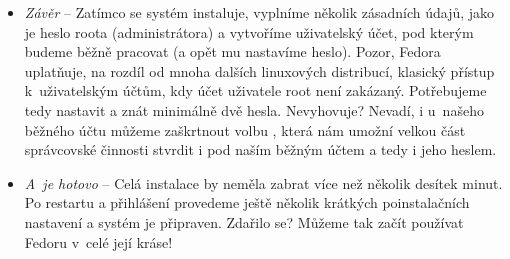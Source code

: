 \begin{itemize}
\item\emph{Závěr} -- Zatímco se systém instaluje, vyplníme několik zásadních údajů, jako je heslo roota (administrátora) a vytvoříme uživatelský účet, pod kterým budeme běžně pracovat (a opět mu nastavíme heslo). Pozor, Fedora uplatňuje, na rozdíl od mnoha dalších linuxových distribucí, klasický přístup k~uživatelským účtům, kdy účet uživatele root není zakázaný. Potřebujeme tedy nastavit a znát minimálně dvě hesla. Nevyhovuje? Nevadí, i u~našeho běžného účtu můžeme zaškrtnout volbu , která nám umožní velkou část správcovské činnosti stvrdit i pod naším běžným účtem a tedy i jeho heslem.

\item\emph{A~je hotovo} -- Celá instalace by neměla zabrat více než několik desítek minut. Po restartu a přihlášení provedeme ještě několik krátkých poinstalačních nastavení a systém je připraven. Zdařilo se? Můžeme tak začít používat Fedoru v~celé její kráse!
\end{itemize}
